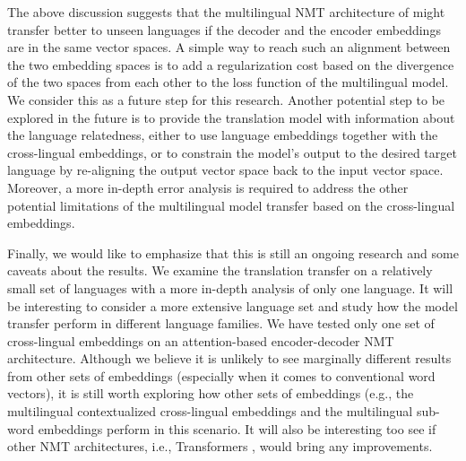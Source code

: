 \documentclass[11pt,a4paper]{article}
\begin{document}
The above discussion suggests that the multilingual NMT architecture of \citet{Johnson:2016aa} might transfer better to unseen languages if the decoder and the encoder embeddings are in the same vector spaces. A simple way to reach such an alignment between the two embedding spaces is to add a regularization cost based on the divergence of the two spaces from each other to the loss function of the multilingual model. We consider this as a future step for this research. Another potential step to be explored in the future is to provide the translation model with information about the language relatedness, either to use language embeddings \citep{littell-etal-2017-uriel} together with the cross-lingual embeddings, or to constrain the model's output to the desired target language by re-aligning the output vector space back to the input vector space. Moreover, a more in-depth error analysis is required to address the other potential limitations of the multilingual model transfer based on the cross-lingual embeddings.

Finally, we would like to emphasize that this is still an ongoing research and some caveats about the results. We examine the translation transfer on a relatively small set of languages with a more in-depth analysis of only one language. It will be interesting to consider a more extensive language set and study how the model transfer perform in different language families. We have tested only one set of cross-lingual embeddings on an attention-based encoder-decoder NMT architecture. Although we believe it is unlikely to see marginally different results from other sets of embeddings (especially when it comes to conventional word vectors), it is still worth exploring how other sets of embeddings (e.g., the multilingual contextualized cross-lingual embeddings \cite{devlin-etal-2019-bert} and the multilingual sub-word embeddings \cite{heinzerling2018bpemb} perform in this scenario. It will also be interesting too see if other NMT architectures, i.e., Transformers \cite{Vaswani:2017aa}, would bring any improvements.

\end{document}
